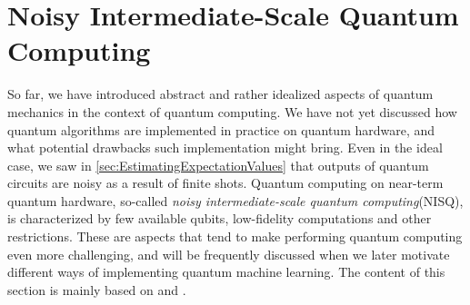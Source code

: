 %

\section{Noisy Intermediate-Scale Quantum Computing}\label{sec:Nisq}
So far, we have introduced abstract and rather idealized aspects of quantum mechanics in the context of quantum computing. We have not yet discussed how quantum algorithms are implemented in practice on quantum hardware, and what potential drawbacks such implementation might bring. Even in the ideal case, we saw in \autoref{sec:EstimatingExpectationValues} that outputs of quantum circuits are noisy as a result of finite shots. Quantum computing on near-term quantum hardware, so-called \emph{noisy intermediate-scale quantum computing}(NISQ)\cite{Preskill_2018}, is characterized by few available qubits, low-fidelity computations and other restrictions. These are aspects that tend to make performing quantum computing even more challenging, and will be frequently discussed when we later motivate different ways of implementing quantum machine learning. The content of this section is mainly based on \cite{SupervisedwquantumComputers} and \cite{Preskill_2018}.


